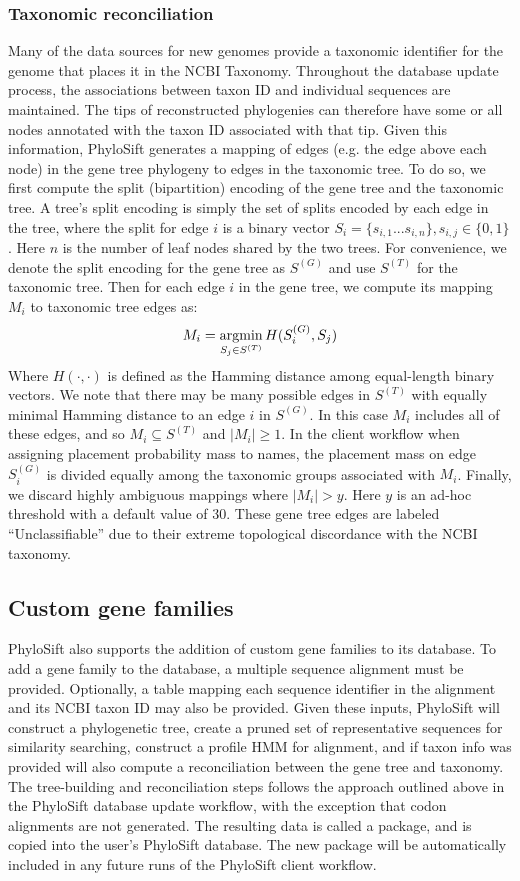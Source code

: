 \documentclass[10pt]{article}
\newcommand{\argmin}{\operatornamewithlimits{argmin}}
\begin{document}
\subsubsection*{Taxonomic reconciliation}
Many of the data sources for new genomes provide a taxonomic identifier for the genome that places it in the NCBI Taxonomy.
Throughout the database update process, the associations between taxon ID and individual sequences are maintained.
The tips of reconstructed phylogenies can therefore have some or all nodes annotated with the taxon ID associated with that tip.
Given this information, PhyloSift generates a mapping of edges (e.g. the edge above each node) in the gene tree phylogeny to edges in the taxonomic tree.
To do so, we first compute the split (bipartition) encoding of the gene tree and the taxonomic tree.
A tree's split encoding is simply the set of splits encoded by each edge in the tree, where the split for edge $i$ is a binary vector $S_i = \{s_{i,1}...s_{i,n}\}, s_{i,j} \in \{0,1\}$.
Here $n$ is the number of leaf nodes shared by the two trees.
For convenience, we denote the split encoding for the gene tree as $S^{(G)}$ and use $S^{(T)}$ for the taxonomic tree.
Then for each edge $i$ in the gene tree, we compute its mapping $M_i$ to taxonomic tree edges as:
$$
M_i = \argmin_{S_j \in S^{(T)}} H(S^{(G)}_i, S_j)
$$
Where $H(\cdot,\cdot)$ is defined as the Hamming distance among equal-length binary vectors.
We note that there may be many possible edges in $S^{(T)}$ with equally minimal Hamming distance to an edge $i$ in $S^{(G)}$.
In this case $M_i$ includes all of these edges, and so $M_i \subseteq S^{(T)}$ and $|M_i| \geq 1$.
In the client workflow when assigning placement probability mass to names, the placement mass on edge $S^{(G)}_i$ is divided equally among the taxonomic groups associated with $M_i$.
Finally, we discard highly ambiguous mappings where $|M_i|>y$. 
Here $y$ is an ad-hoc threshold with a default value of 30.
These gene tree edges are labeled ``Unclassifiable'' due to their extreme topological discordance with the NCBI taxonomy.

\subsection*{Custom gene families}

PhyloSift also supports the addition of custom gene families to its database.
To add a gene family to the database, a multiple sequence alignment must be provided.
Optionally, a table mapping each sequence identifier in the alignment and its NCBI taxon ID may also be provided.
Given these inputs, PhyloSift will construct a phylogenetic tree, create a pruned set of representative sequences for similarity searching, construct a profile HMM for alignment, and if taxon info was provided will also compute a reconciliation between the gene tree and taxonomy.
The tree-building and reconciliation steps follows the approach outlined above in the PhyloSift database update workflow, with the exception that codon alignments are not generated.
The resulting data is called a package, and is copied into the user's PhyloSift database.
The new package will be automatically included in any future runs of the PhyloSift client workflow.
\end{document}
